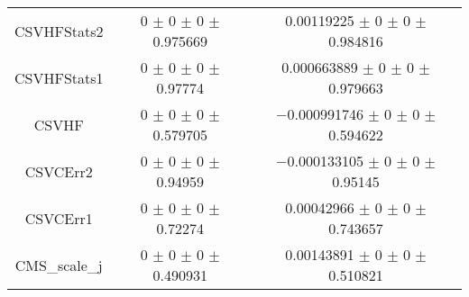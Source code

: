 \begin{table}
\begin{tabular}{ccc}
CSVHFStats2 & \num{0} $\pm$ \num{0} $\pm$ \num{0} $\pm$ \num{0.975669} & \num{0.00119225} $\pm$ \num{0} $\pm$ \num{0} $\pm$ \num{0.984816}\\
CSVHFStats1 & \num{0} $\pm$ \num{0} $\pm$ \num{0} $\pm$ \num{0.97774} & \num{0.000663889} $\pm$ \num{0} $\pm$ \num{0} $\pm$ \num{0.979663}\\
CSVHF & \num{0} $\pm$ \num{0} $\pm$ \num{0} $\pm$ \num{0.579705} & \num{-0.000991746} $\pm$ \num{0} $\pm$ \num{0} $\pm$ \num{0.594622}\\
CSVCErr2 & \num{0} $\pm$ \num{0} $\pm$ \num{0} $\pm$ \num{0.94959} & \num{-0.000133105} $\pm$ \num{0} $\pm$ \num{0} $\pm$ \num{0.95145}\\
CSVCErr1 & \num{0} $\pm$ \num{0} $\pm$ \num{0} $\pm$ \num{0.72274} & \num{0.00042966} $\pm$ \num{0} $\pm$ \num{0} $\pm$ \num{0.743657}\\
CMS\_scale\_j & \num{0} $\pm$ \num{0} $\pm$ \num{0} $\pm$ \num{0.490931} & \num{0.00143891} $\pm$ \num{0} $\pm$ \num{0} $\pm$ \num{0.510821}\\
\bottomrule
\end{tabular}
\end{table}